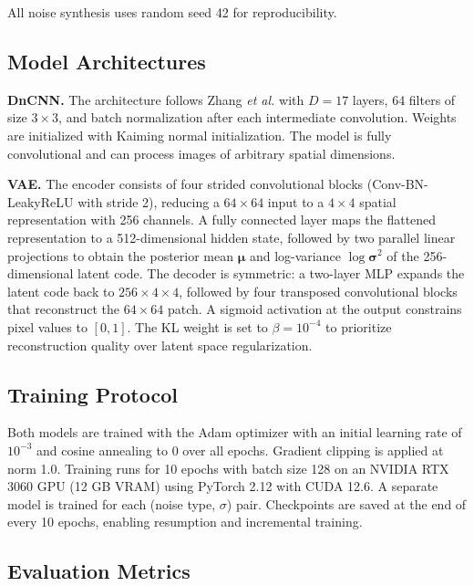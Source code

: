 \documentclass[conference]{IEEEtran}
\begin{document}
All noise synthesis uses random seed 42 for reproducibility.

\subsection{Model Architectures}

\textbf{DnCNN.} The architecture follows Zhang \textit{et al.}
\cite{zhang2017beyond} with \(D = 17\) layers, 64 filters of size
\(3\times3\), and batch normalization after each intermediate convolution.
Weights are initialized with Kaiming normal initialization. The model is
fully convolutional and can process images of arbitrary spatial
dimensions.

\textbf{VAE.} The encoder consists of four strided convolutional blocks
(Conv-BN-LeakyReLU with stride 2), reducing a \(64\times64\) input to a
\(4\times4\) spatial representation with 256 channels. A fully connected
layer maps the flattened representation to a 512-dimensional hidden
state, followed by two parallel linear projections to obtain the
posterior mean \(\boldsymbol{\mu}\) and log-variance \(\log
\boldsymbol{\sigma}^2\) of the 256-dimensional latent code. The decoder
is symmetric: a two-layer MLP expands the latent code back to
\(256\times4\times4\), followed by four transposed convolutional blocks
that reconstruct the \(64\times64\) patch. A sigmoid activation at the
output constrains pixel values to \([0, 1]\). The KL weight is set to
\(\beta = 10^{-4}\) to prioritize reconstruction quality over latent
space regularization.

\subsection{Training Protocol}

Both models are trained with the Adam optimizer \cite{kingma2015adam}
with an initial learning rate of \(10^{-3}\) and cosine annealing to
\(0\) over all epochs. Gradient clipping is applied at norm 1.0.
Training runs for 10 epochs with batch size 128 on an NVIDIA RTX 3060
GPU (12 GB VRAM) using PyTorch 2.12 with CUDA 12.6. A separate model is
trained for each (noise type, \(\sigma\)) pair. Checkpoints are saved at
the end of every 10 epochs, enabling resumption and incremental training.

\subsection{Evaluation Metrics}
\end{document}
